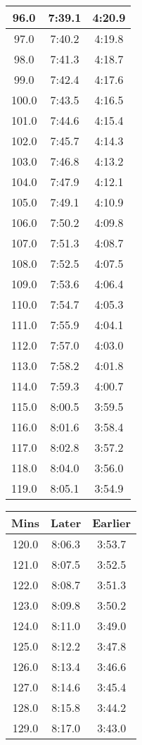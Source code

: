 \begin{footnotesize}
\begin{minipage}{0.25\textwidth}
\begin{tabular}[t]{c|c|c}
	96.0&7:39.1&4:20.9\\\hline
	97.0&7:40.2&4:19.8\\\hline
	98.0&7:41.3&4:18.7\\\hline
	99.0&7:42.4&4:17.6\\\hline
	100.0&7:43.5&4:16.5\\\hline
	101.0&7:44.6&4:15.4\\\hline
	102.0&7:45.7&4:14.3\\\hline
	103.0&7:46.8&4:13.2\\\hline
	104.0&7:47.9&4:12.1\\\hline
	105.0&7:49.1&4:10.9\\\hline
	106.0&7:50.2&4:09.8\\\hline
	107.0&7:51.3&4:08.7\\\hline
	108.0&7:52.5&4:07.5\\\hline
	109.0&7:53.6&4:06.4\\\hline
	110.0&7:54.7&4:05.3\\\hline
	111.0&7:55.9&4:04.1\\\hline
	112.0&7:57.0&4:03.0\\\hline
	113.0&7:58.2&4:01.8\\\hline
	114.0&7:59.3&4:00.7\\\hline
	115.0&8:00.5&3:59.5\\\hline
	116.0&8:01.6&3:58.4\\\hline
	117.0&8:02.8&3:57.2\\\hline
	118.0&8:04.0&3:56.0\\\hline
	119.0&8:05.1&3:54.9\\\hline
		\end{tabular}\end{minipage}
\begin{minipage}{0.25\textwidth}\begin{tabular}[t]{c|c|c}
			Mins&Later&Earlier\\\hline
	120.0&8:06.3&3:53.7\\\hline
	121.0&8:07.5&3:52.5\\\hline
	122.0&8:08.7&3:51.3\\\hline
	123.0&8:09.8&3:50.2\\\hline
	124.0&8:11.0&3:49.0\\\hline
	125.0&8:12.2&3:47.8\\\hline
	126.0&8:13.4&3:46.6\\\hline
	127.0&8:14.6&3:45.4\\\hline
	128.0&8:15.8&3:44.2\\\hline
	129.0&8:17.0&3:43.0\\\hline

\end{tabular}
\end{minipage}
\end{footnotesize}
